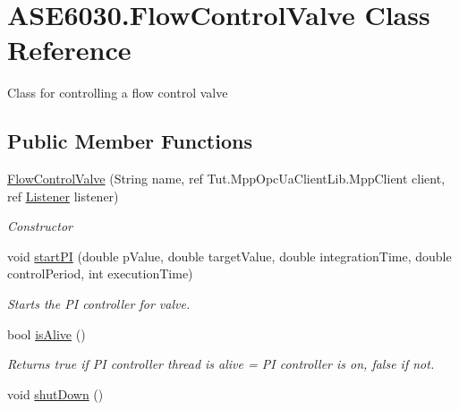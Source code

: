 \hypertarget{class_a_s_e6030_1_1_flow_control_valve}{}\section{A\+S\+E6030.\+Flow\+Control\+Valve Class Reference}
\label{class_a_s_e6030_1_1_flow_control_valve}


Class for controlling a flow control valve  


\subsection*{Public Member Functions}
\begin{DoxyCompactItemize}
\item 
\hyperlink{class_a_s_e6030_1_1_flow_control_valve_a30ba36af47913e18552ee88461ad70b7}{Flow\+Control\+Valve} (String name, ref Tut.\+Mpp\+Opc\+Ua\+Client\+Lib.\+Mpp\+Client client, ref \hyperlink{class_a_s_e6030_1_1_listener}{Listener} listener)
\begin{DoxyCompactList}\small\item\em Constructor \end{DoxyCompactList}\item 
void \hyperlink{class_a_s_e6030_1_1_flow_control_valve_a0a92ca1afb6da92e55a652e07361fd56}{start\+PI} (double p\+Value, double target\+Value, double integration\+Time, double control\+Period, int execution\+Time)
\begin{DoxyCompactList}\small\item\em Starts the PI controller for valve. \end{DoxyCompactList}\item 
\mbox{\label{class_a_s_e6030_1_1_flow_control_valve_a40d3c7db594ce3676397ef66c4839991}} 
bool \hyperlink{class_a_s_e6030_1_1_flow_control_valve_a40d3c7db594ce3676397ef66c4839991}{is\+Alive} ()
\begin{DoxyCompactList}\small\item\em Returns true if PI controller thread is alive = PI controller is on, false if not. \end{DoxyCompactList}\item 
\mbox{\label{class_a_s_e6030_1_1_flow_control_valve_a97127ac85cda57ed8f6da68b4647700f}} 
void \hyperlink{class_a_s_e6030_1_1_flow_control_valve_a97127ac85cda57ed8f6da68b4647700f}{shut\+Down} ()

\end{DoxyCompactItemize}
